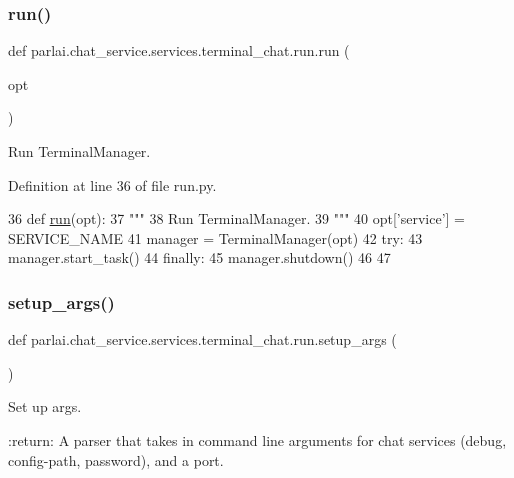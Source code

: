 \subsubsection{\texorpdfstring{run()}{run()}}
{\footnotesize\ttfamily def parlai.\+chat\+\_\+service.\+services.\+terminal\+\_\+chat.\+run.\+run (\begin{DoxyParamCaption}\item[{}]{opt }\end{DoxyParamCaption})}

\begin{DoxyVerb}Run TerminalManager.
\end{DoxyVerb}
 

Definition at line 36 of file run.\+py.


\begin{DoxyCode}
36 \textcolor{keyword}{def }\hyperlink{namespaceparlai_1_1tasks_1_1talkthewalk_1_1run_a0a1ec08b8196cb008e4df83468c67e5b}{run}(opt):
37     \textcolor{stringliteral}{"""}
38 \textcolor{stringliteral}{    Run TerminalManager.}
39 \textcolor{stringliteral}{    """}
40     opt[\textcolor{stringliteral}{'service'}] = SERVICE\_NAME
41     manager = TerminalManager(opt)
42     \textcolor{keywordflow}{try}:
43         manager.start\_task()
44     \textcolor{keywordflow}{finally}:
45         manager.shutdown()
46 
47 
\end{DoxyCode}
\mbox{\label{namespaceparlai_1_1chat__service_1_1services_1_1terminal__chat_1_1run_a644a131d95fe6a2053b91eddd022fbf6}} 
\subsubsection{\texorpdfstring{setup\+\_\+args()}{setup\_args()}}
{\footnotesize\ttfamily def parlai.\+chat\+\_\+service.\+services.\+terminal\+\_\+chat.\+run.\+setup\+\_\+args (\begin{DoxyParamCaption}{ }\end{DoxyParamCaption})}

\begin{DoxyVerb}Set up args.

:return: A parser that takes in command line arguments for chat services (debug, config-path, password), and a port.
\end{DoxyVerb}
 

